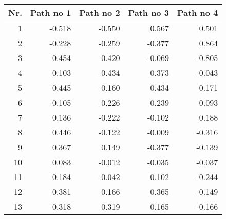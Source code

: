 \begin{tabular}{|r|r|r|r|r|}
  \hline
  \textbf{Nr.}&  \textbf{Path no 1}&  \textbf{Path no 2}&  \textbf{Path no 3}&  \textbf{Path no 4}\\
  \hline
  1& -0.518& -0.550& 0.567& 0.501\\
  \hline
  2& -0.228& -0.259& -0.377& 0.864\\
  \hline
  3& 0.454& 0.420& -0.069& -0.805\\
  \hline
  4& 0.103& -0.434& 0.373& -0.043\\
  \hline
  5& -0.445& -0.160& 0.434& 0.171\\
  \hline
  6& -0.105& -0.226& 0.239& 0.093\\
  \hline
  7& 0.136& -0.222& -0.102& 0.188\\
  \hline
  8& 0.446& -0.122& -0.009& -0.316\\
  \hline
  9& 0.367& 0.149& -0.377& -0.139\\
  \hline
  10& 0.083& -0.012& -0.035& -0.037\\
  \hline
  11& 0.184& -0.042& 0.102& -0.244\\
  \hline
  12& -0.381& 0.166& 0.365& -0.149\\
  \hline
  13& -0.318& 0.319& 0.165& -0.166\\
  \hline
\end{tabular}
